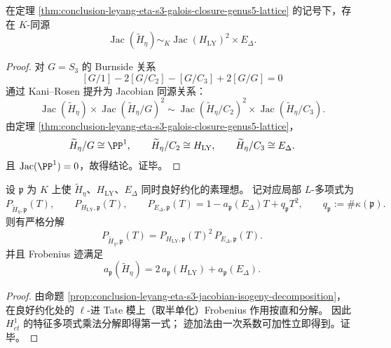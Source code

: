 \begin{proposition}\label{prop:conclusion-leyang-eta-s3-jacobian-isogeny-decomposition}
在定理 \ref{thm:conclusion-leyang-eta-s3-galois-closure-genus5-lattice} 的记号下，存在 \(K\)-同源
\[
\operatorname{Jac}(\widetilde H_\eta)\sim_K \operatorname{Jac}(H_{\mathrm{LY}})^2\times E_\Delta.
\]
\end{proposition}
\begin{proof}
对 \(G=S_3\) 的 Burnside 关系
\[
[G/1]-2[G/C_2]-[G/C_3]+2[G/G]=0
\]
通过 Kani--Rosen 提升为 Jacobian 同源关系：
\[
\operatorname{Jac}(\widetilde H_\eta)\times \operatorname{Jac}(\widetilde H_\eta/G)^2
\sim
\operatorname{Jac}(\widetilde H_\eta/C_2)^2\times \operatorname{Jac}(\widetilde H_\eta/C_3).
\]
由定理 \ref{thm:conclusion-leyang-eta-s3-galois-closure-genus5-lattice}，
\[
\widetilde H_\eta/G\cong \PP^1,\qquad
\widetilde H_\eta/C_2\cong H_{\mathrm{LY}},\qquad
\widetilde H_\eta/C_3\cong E_\Delta.
\]
且 \(\operatorname{Jac}(\PP^1)=0\)，故得结论。证毕。
\end{proof}

\begin{corollary}\label{cor:conclusion-leyang-eta-local-lfactor-square-rigidity}
设 \(\mathfrak p\) 为 \(K\) 上使 \(\widetilde H_\eta\)、\(H_{\mathrm{LY}}\)、\(E_\Delta\) 同时良好约化的素理想。
记对应局部 \(L\)-多项式为
\[
P_{\widetilde H_\eta,\mathfrak p}(T),\qquad
P_{H_{\mathrm{LY}},\mathfrak p}(T),\qquad
P_{E_\Delta,\mathfrak p}(T)=1-a_{\mathfrak p}(E_\Delta)T+q_{\mathfrak p}T^2,\qquad
q_{\mathfrak p}:=\#\kappa(\mathfrak p).
\]
则有严格分解
\[
P_{\widetilde H_\eta,\mathfrak p}(T)
=
P_{H_{\mathrm{LY}},\mathfrak p}(T)^2\,
P_{E_\Delta,\mathfrak p}(T).
\]
并且 Frobenius 迹满足
\[
a_{\mathfrak p}(\widetilde H_\eta)
=2\,a_{\mathfrak p}(H_{\mathrm{LY}})+a_{\mathfrak p}(E_\Delta).
\]
\end{corollary}
\begin{proof}
由命题 \ref{prop:conclusion-leyang-eta-s3-jacobian-isogeny-decomposition}，
在良好约化处的 \(\ell\)-进 Tate 模上（取半单化）Frobenius 作用按直和分解。
因此 \(H^1_{\acute et}\) 的特征多项式乘法分解即得第一式；
迹加法由一次系数可加性立即得到。证毕。
\end{proof}
